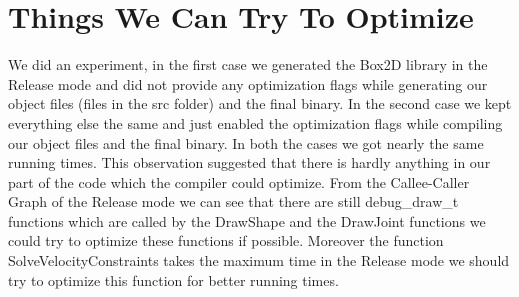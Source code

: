 \documentclass[11pt]{article}
\begin{document}
\section{Things We Can Try To Optimize}
	We did an experiment, in the first case we generated the Box2D library in the Release mode and did not provide any optimization flags while generating our object files (files in the src folder) and the final binary. In the second case we kept everything else the same and just enabled the optimization flags while compiling our object files and the final binary. In both the cases we got nearly the same running times. This observation suggested that there is hardly anything in our part of the code which the compiler could optimize.\newline
	From the Callee-Caller Graph of the Release mode we can see that there are still debug\_draw\_t functions which are called by the DrawShape and the DrawJoint functions we could try to optimize these functions if possible.\newline
	Moreover the function SolveVelocityConstraints takes the maximum time in the Release mode we should try to optimize this function for better running times. 
\end{document}
